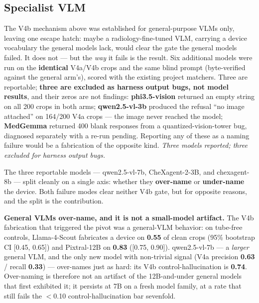 \documentclass{ieeeaccess}
\begin{document}
\subsection{Specialist VLM}
\label{sec:specialist}
The V4b mechanism above was established for general-purpose VLMs only, leaving one escape hatch: maybe a radiology-fine-tuned VLM, carrying a device vocabulary the general models lack, would clear the gate the general models failed. It does not --- but the \emph{way} it fails is the result. Six additional models were run on the \textbf{identical} V4a/V4b crops and the same blind prompt (byte-verified against the general arm's), scored with the existing project matchers. Three are reportable; \textbf{three are excluded as harness output bugs, not model results}, and their zeros are not findings: \textbf{phi3.5-vision} returned an empty string on all 200 crops in both arms; \textbf{qwen2.5-vl-3b} produced the refusal ``no image attached'' on 164/200 V4a crops --- the image never reached the model; \textbf{MedGemma} returned 400 blank responses from a quantized-vision-tower bug, diagnosed separately with a re-run pending. Reporting any of these as a naming failure would be a fabrication of the opposite kind. \emph{Three models reported; three excluded for harness output bugs.}

The three reportable models --- qwen2.5-vl-7b, CheXagent-2-3B, and chexagent-8b --- split cleanly on a single axis: whether they \textbf{over-name} or \textbf{under-name} the device. Both failure modes clear neither V4b gate, but for opposite reasons, and the split is the contribution.

\textbf{General VLMs over-name, and it is not a small-model artifact.} The V4b fabrication that triggered the pivot was a general-VLM behavior: on tube-free controls, Llama-4-Scout fabricates a device on \textbf{0.55} of clean crops (95\% bootstrap CI [0.45, 0.65]) and Pixtral-12B on \textbf{0.83} ([0.75, 0.90]). qwen2.5-vl-7b --- a \emph{larger} general VLM, and the only new model with non-trivial signal (V4a precision \textbf{0.63} / recall \textbf{0.33}) --- over-names just as hard: its V4b control-hallucination is \textbf{0.74}. Over-naming is therefore not an artifact of the 12B-and-under general models that first exhibited it; it persists at 7B on a fresh model family, at a rate that still fails the $<$0.10 control-hallucination bar sevenfold.
\end{document}
